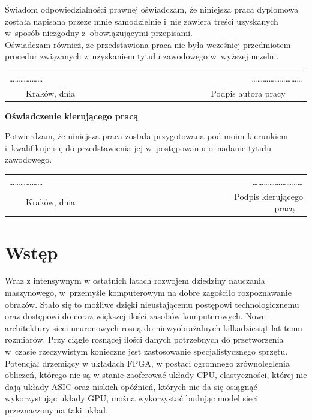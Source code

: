 \documentclass[12pt, oneside, a4paper]{article}
\begin{document}
\noindent Świadom odpowiedzialności prawnej oświadczam, że niniejsza praca
dyplomowa została napisana przeze mnie samodzielnie i~nie zawiera treści
uzyskanych w~sposób niezgodny z~obowiązującymi przepisami.\\

\noindent Oświadczam również, że przedstawiona praca nie była wcześniej
przedmiotem procedur związanych z~uzyskaniem
tytułu zawodowego w~wyższej uczelni.
\vspace{2cm}
\begin{center}
\begin{tabular}{lr}
\ldots\ldots\ldots\ldots\ldots\ldots~~~~~~~~~~~~~~~~~~~~~~~~~~~~~~~~~~~~~~&
\ldots\ldots\ldots\ldots\ldots\ldots\ldots\ldots\ldots \\
{~~~~Kraków, dnia} & {Podpis autora pracy~~~~}
\end{tabular}
\end{center}
\vspace{5cm}
\begin{flushleft}
\large \textbf{Oświadczenie kierującego pracą}
\end{flushleft}

\noindent Potwierdzam, że niniejsza praca została przygotowana pod moim
kierunkiem i~kwalifikuje się do przedstawienia jej w~postępowaniu
o~nadanie tytułu zawodowego.
\vspace{2cm}
\begin{center}
\begin{tabular}{lr}
\ldots\ldots\ldots\ldots\ldots\ldots~~~~~~~~~~~~~~~~~~~~~~~~~~~~~~~~~~~~~~&
\ldots\ldots\ldots\ldots\ldots\ldots\ldots\ldots\ldots \\
{~~~~Kraków, dnia} & {Podpis kierującego pracą~~}
\end{tabular}
\end{center}
\vfill

\newpage
\tableofcontents

\newpage
\section*{Wstęp}
%
Wraz z intensywnym w ostatnich latach rozwojem dziedziny nauczania maszynowego,
w~przemyśle komputerowym na dobre zagościło rozpoznawanie obrazów. Stało
się to możliwe dzięki nieustającemu postępowi technologicznemu oraz
dostępowi do coraz większej ilości zasobów komputerowych. Nowe architektury
sieci neuronowych rosną do niewyobrażalnych kilkadziesiąt lat temu rozmiarów.
Przy ciągle rosnącej ilości danych potrzebnych do przetworzenia w~czasie
rzeczywistym konieczne jest zastosowanie specjalistycznego sprzętu.
Potencjał drzemiący w układach FPGA, w postaci
ogromnego zrównoleglenia obliczeń, którego nie są w stanie zaoferować układy CPU,
elastyczności, której nie dają układy ASIC oraz
niskich opóźnień, których nie da się osiągnąć wykorzystując układy GPU,
można wykorzystać budując model sieci przeznaczony na taki układ.
\end{document}
